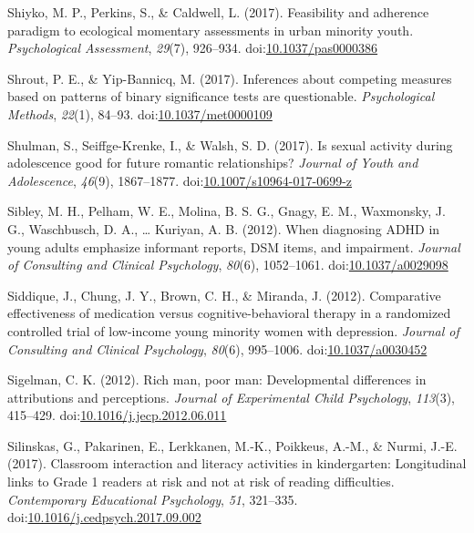 \documentclass[english,man]{apa6}
\theoremstyle{definition}
\theoremstyle{definition}
\theoremstyle{definition}
\theoremstyle{remark}
\begin{document}
\hypertarget{ref-Shiyko2017}{}
Shiyko, M. P., Perkins, S., \& Caldwell, L. (2017). Feasibility and
adherence paradigm to ecological momentary assessments in urban minority
youth. \emph{Psychological Assessment}, \emph{29}(7), 926--934.
doi:\href{https://doi.org/10.1037/pas0000386}{10.1037/pas0000386}

\hypertarget{ref-Shrout2017}{}
Shrout, P. E., \& Yip-Bannicq, M. (2017). Inferences about competing
measures based on patterns of binary significance tests are
questionable. \emph{Psychological Methods}, \emph{22}(1), 84--93.
doi:\href{https://doi.org/10.1037/met0000109}{10.1037/met0000109}

\hypertarget{ref-Shulman2017}{}
Shulman, S., Seiffge-Krenke, I., \& Walsh, S. D. (2017). Is sexual
activity during adolescence good for future romantic relationships?
\emph{Journal of Youth and Adolescence}, \emph{46}(9), 1867--1877.
doi:\href{https://doi.org/10.1007/s10964-017-0699-z}{10.1007/s10964-017-0699-z}

\hypertarget{ref-Sibley2012}{}
Sibley, M. H., Pelham, W. E., Molina, B. S. G., Gnagy, E. M., Waxmonsky,
J. G., Waschbusch, D. A., \ldots{} Kuriyan, A. B. (2012). When
diagnosing ADHD in young adults emphasize informant reports, DSM items,
and impairment. \emph{Journal of Consulting and Clinical Psychology},
\emph{80}(6), 1052--1061.
doi:\href{https://doi.org/10.1037/a0029098}{10.1037/a0029098}

\hypertarget{ref-Siddique2012}{}
Siddique, J., Chung, J. Y., Brown, C. H., \& Miranda, J. (2012).
Comparative effectiveness of medication versus cognitive-behavioral
therapy in a randomized controlled trial of low-income young minority
women with depression. \emph{Journal of Consulting and Clinical
Psychology}, \emph{80}(6), 995--1006.
doi:\href{https://doi.org/10.1037/a0030452}{10.1037/a0030452}

\hypertarget{ref-Sigelman2012}{}
Sigelman, C. K. (2012). Rich man, poor man: Developmental differences in
attributions and perceptions. \emph{Journal of Experimental Child
Psychology}, \emph{113}(3), 415--429.
doi:\href{https://doi.org/10.1016/j.jecp.2012.06.011}{10.1016/j.jecp.2012.06.011}

\hypertarget{ref-Silinskas2017}{}
Silinskas, G., Pakarinen, E., Lerkkanen, M.-K., Poikkeus, A.-M., \&
Nurmi, J.-E. (2017). Classroom interaction and literacy activities in
kindergarten: Longitudinal links to Grade 1 readers at risk and not at
risk of reading difficulties. \emph{Contemporary Educational
Psychology}, \emph{51}, 321--335.
doi:\href{https://doi.org/10.1016/j.cedpsych.2017.09.002}{10.1016/j.cedpsych.2017.09.002}
\end{document}

